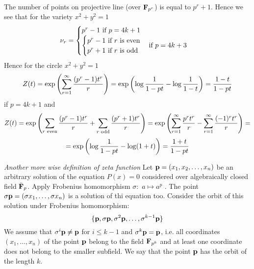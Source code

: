 \documentclass[12pt]{article}
\theoremstyle{theorem}
\numberwithin{equation}{section}
\begin{document}
The number of points on projective line (over ${\bf F}_{p^r}$) is equal to $p^r+1$.
Hence we see that  for the variety $x^2+y^2=1$
         \begin{equation}\label{numberofpointoncircle}
    \nu_r=
     \begin{cases}
        p^r-1\,\, \hbox {if $p=4k+1$}\\
         \begin{cases}
        p^r-1\,\, \hbox {if $r$ is even}\\
         p^r+1\,\, \hbox {if $r$ is odd}\\
     \end{cases}\hbox {if $p=4k+3$}
     \end{cases}
\end{equation}
  Hence  for the circle $x^2+y^2=1$
\begin{equation}\label{zetafunctionforcircleif$p=4k+1$}
Z(t)=\exp\left(\sum_{r=1}^\infty{(p^r-1)t^r\over r}\right)=\exp\left(\log{1\over 1-pt}-\log{1\over 1-t}\right)=
     {1-t\over 1-pt}
\end{equation}
if $p=4k+1$
and
              $$
Z(t)=\exp\left(\sum_{r\,\,{\rm even}}{(p^r-1)t^r\over r}+\sum_{r\,\,{\rm odd}}{(p^r+1)t^r\over r}\right)=
\exp\left(\sum_{r=1}^\infty{p^rt^r\over r}-\sum_{r=1}^\infty{(-1)^rt^r\over r}\right)=
       $$
\begin{equation}\label{zetafunctionforcircleif$p=4k+3$}
=\exp\left(\log{1\over 1-pt}-\log (1+t)\right)=
     {1+t\over 1-pt}
\end{equation}

\medskip

{\it Another more wise definition of zeta function}
\def\p {{\bf p}}
 Let $\p=(x_1,x_2,\dots,x_n)$ be an arbitrary solution of the equation $P(x)=0$ considered over algebraically closed
 field $\bar {{\bf F}}_p$. Apply Frobenius homomorphism $\sigma\colon \,\,a\mapsto a^p$ . The
  point $\sigma \p=(\sigma x_1,\dots,\sigma x_n)$ is a solution of thi equation too.
  Consider the orbit of this solution under Frobenius homomorphism:
                 \begin{equation}\label{orbitofsolution}
  \{\p, \sigma\p,\sigma^2\p,\dots,\sigma^{k-1}\p\}
\end{equation}
We assume that $\sigma^i \p\not=\p$ for $i\leq k-1$ and $\sigma^k\p=\p$, i.e. all coordinates $(x_1,\dots,x_n)$
of the point $\p$ belong to the field ${\bf F}_{p^k}$ and at least one coordinate does not belong to the smaller subfield.
We say that the point $\p$ has the orbit of the length $k$.
\end{document}
